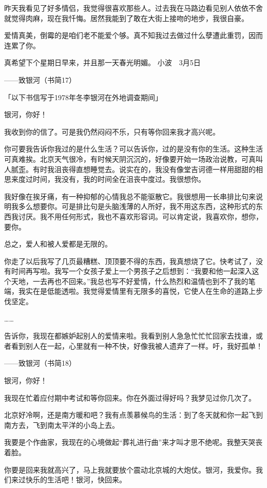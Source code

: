 昨天我看见了好多情侣，我觉得很喜欢那些人。过去我在马路边看见别人依依不舍就觉得肉麻，现在我忏悔。居然我能到了敢在大街上接吻的地步，我很自豪。 

爱情真美，倒霉的是咱们老不能爱个够。真不知我过去做过什么孽遭此重罚，因而连累了你。 

真希望下个星期日早来，并且那一天春光明媚。 小波　3月5日 





——致银河（书简17） 

「以下书信写于1978年冬李银河在外地调查期间」 

银河，你好！ 

我收到你的信了。可是我仍然闷闷不乐，只有等你回来我才高兴呢。 

你可要我告诉你我过的是什么生活？可以告诉你，过的是没有你的生活。这种生活可真难挨。北京天气很冷，有时候天阴沉沉的，好像要开始一场政治说教，可真叫人腻歪。有时我沮丧得直想睡觉去。说实在的，我没有像堂吉诃德一样用甜甜的相思来度过时间，我没有，我的时间全在沮丧中度过。我很想你。 

我好像在挨牙痛，有一种抑郁的心情我总不能驱散它。我很想用一长串排比句来说明我多么想要你。可是排比句是头脑浅薄的人所好，我不用这东西，这种形式的东西我讨厌。我不用任何形式，我也不喜欢形容词。可以肯定说，我喜欢你，想你，要你。 

总之，爱人和被人爱都是无限的。 

你走了以后我写了几页最糟糕、顶顶要不得的东西，我真想烧了它。快考试了，没有时间再写啦。我写一个女孩子爱上一个男孩子之后想到：“我要和他一起深入这个天地，一去再也不回来。”我总也写不好爱情，什么热烈和温情也到不了我的笔端，我实在是低能透啦。我觉得爱情里有无限多的喜悦，它使人在生命的道路上步伐坚定。 

…… 

告诉你，我现在都嫉妒起别人的爱情来啦。我看到别人急急忙忙忙回家去找谁，或者看到别人在一起，心里就有一种不快，好像我被人遗弃了一样。吁，我好孤单！ 





——致银河（书简18） 

银河，你好！ 

我现在忙着应付期中考试和等你回来。你在外面过得好吗？我梦见过你几次了。 

北京好冷啊，还是南方暖和吧？我有点羡慕候鸟的生活：到了冬天就和你一起飞到南方去，飞到南太平洋的小岛上去。 

我要是个作曲家，我现在的心境做起“葬礼进行曲”来才叫才思不绝呢。我整天哭丧着脸。 

你要是回来我就高兴了，马上我就要放个震动北京城的大炮仗。银河，我爱你。我们来过快乐的生活吧！银河，快回来。 


